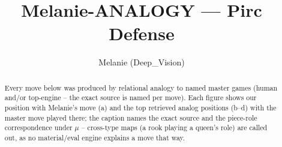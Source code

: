 \documentclass[11pt]{article}
\title{Melanie-ANALOGY — Pirc Defense}
\author{Melanie (Deep\_Vision)}
\date{}
\begin{document}
\maketitle

\begin{abstract}Every move below was produced by relational analogy to named master games (human and/or top-engine -- the exact source is named per move). Each figure shows our position with Melanie's move (a) and the top retrieved analog positions (b--d) with the master move played there; the caption names the exact source and the piece-role correspondence under $\mu$ -- cross-type maps (a rook playing a queen's role) are called out, as no material/eval engine explains a move that way.\end{abstract}

\begin{figure}[p]\centering
\begin{subfigure}{0.46\textwidth}\centering
\resizebox{\linewidth}{!}{%
\newchessgame
\chessboard[
  setfen={rnbq1rk1/pp2ppbp/2pp1np1/8/3PP3/2N2N2/PPP1BPPP/R1BQ1RK1 w - - 0 7},
  showmover=false,
  pgfstyle=straightmove, color=movearrow, markmove={f1-e1}
]}
\caption{}
\end{subfigure}\hfill
\begin{subfigure}{0.46\textwidth}\centering
\resizebox{\linewidth}{!}{%
\newchessgame
\chessboard[
  setfen={r1bq1rk1/ppp2pbp/n2p1np1/4p3/2PPP3/2N2N2/PP2BPPP/R1BQ1RK1 w - - 2 8},
  showmover=false,
  pgfstyle=straightmove, color=movearrow, markmove={f1-e1}
]}
\caption{}
\end{subfigure}
\\[4pt]
\begin{subfigure}{0.46\textwidth}\centering
\resizebox{\linewidth}{!}{%
\newchessgame
\chessboard[
  setfen={r1bq1rk1/ppp2pbp/n2p1np1/4p3/2PPP3/2N2N2/PP2BPPP/R1BQ1RK1 w - - 2 8},
  showmover=false,
  pgfstyle=straightmove, color=movearrow, markmove={f1-e1}
]}
\caption{}
\end{subfigure}\hfill
\begin{subfigure}{0.46\textwidth}\centering
\resizebox{\linewidth}{!}{%
\newchessgame
\chessboard[
  setfen={r1bq1rk1/ppp2pbp/n2p1np1/4p3/2PPP3/2N2N2/PP2BPPP/R1BQ1RK1 w - - 0 8},
  showmover=false,
  pgfstyle=straightmove, color=movearrow, markmove={f1-e1}
]}
\caption{}
\end{subfigure}

\end{figure}
\end{document}

